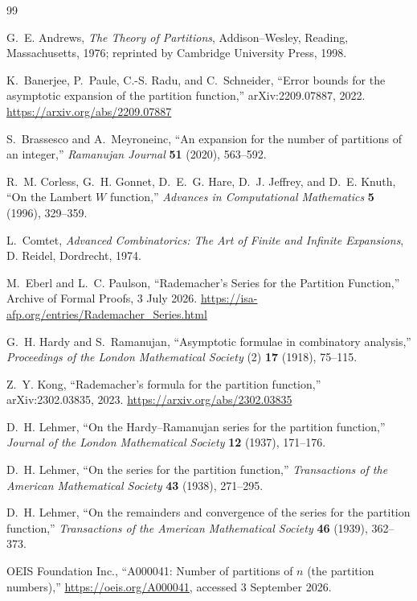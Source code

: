 \documentclass[11pt,a4paper]{article}
\numberwithin{equation}{section}
\theoremstyle{remark}
\begin{document}
\begin{thebibliography}{99}

G.~E. Andrews,
\emph{The Theory of Partitions},
Addison--Wesley, Reading, Massachusetts, 1976; reprinted by Cambridge University Press, 1998.

K.~Banerjee, P.~Paule, C.-S. Radu, and C.~Schneider,
``Error bounds for the asymptotic expansion of the partition function,''
arXiv:2209.07887, 2022.
\url{https://arxiv.org/abs/2209.07887}

S.~Brassesco and A.~Meyroneinc,
``An expansion for the number of partitions of an integer,''
\emph{Ramanujan Journal} \textbf{51} (2020), 563--592.

R.~M. Corless, G.~H. Gonnet, D.~E.~G. Hare, D.~J. Jeffrey, and D.~E. Knuth,
``On the Lambert $W$ function,''
\emph{Advances in Computational Mathematics} \textbf{5} (1996), 329--359.

L.~Comtet,
\emph{Advanced Combinatorics: The Art of Finite and Infinite Expansions},
D. Reidel, Dordrecht, 1974.

M.~Eberl and L.~C. Paulson,
``Rademacher's Series for the Partition Function,''
Archive of Formal Proofs, 3 July 2026.
\url{https://isa-afp.org/entries/Rademacher_Series.html}

G.~H. Hardy and S.~Ramanujan,
``Asymptotic formulae in combinatory analysis,''
\emph{Proceedings of the London Mathematical Society} (2) \textbf{17} (1918), 75--115.

Z.~Y. Kong,
``Rademacher's formula for the partition function,''
arXiv:2302.03835, 2023.
\url{https://arxiv.org/abs/2302.03835}

D.~H. Lehmer,
``On the Hardy--Ramanujan series for the partition function,''
\emph{Journal of the London Mathematical Society} \textbf{12} (1937), 171--176.

D.~H. Lehmer,
``On the series for the partition function,''
\emph{Transactions of the American Mathematical Society} \textbf{43} (1938), 271--295.

D.~H. Lehmer,
``On the remainders and convergence of the series for the partition function,''
\emph{Transactions of the American Mathematical Society} \textbf{46} (1939), 362--373.

OEIS Foundation Inc.,
``A000041: Number of partitions of $n$ (the partition numbers),''
\url{https://oeis.org/A000041}, accessed 3 September 2026.


\end{thebibliography}
\end{document}
